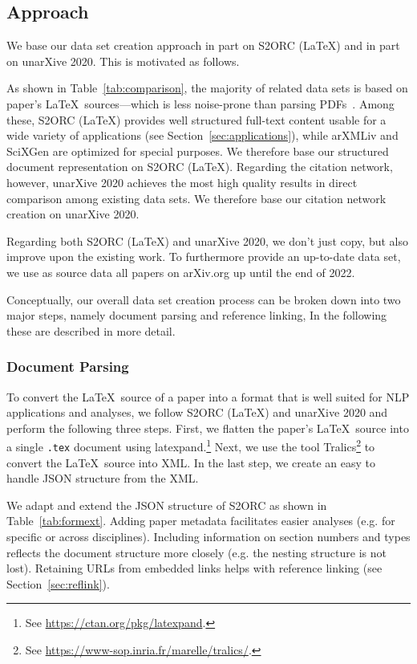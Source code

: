 \subsection{Approach}

We base our data set creation approach in part on S2ORC (\LaTeX) and in part on unarXive 2020. This is motivated as follows.

As shown in Table~\ref{tab:comparison}, the majority of related data sets is based on paper's \LaTeX\ sources---which is less noise-prone than parsing PDFs~\cite{Bast2017}. Among these, S2ORC (\LaTeX) provides well structured full-text content usable for a wide variety of applications (see Section~\ref{sec:applications}), while arXMLiv and SciXGen are optimized for special purposes. We therefore base our structured document representation on S2ORC (\LaTeX). Regarding the citation network, however, unarXive 2020 achieves the most high quality results in direct comparison among existing data sets. We therefore base our citation network creation on unarXive 2020.

Regarding both S2ORC (\LaTeX) and unarXive 2020, we don't just copy, but also improve upon the existing work. To furthermore provide an up-to-date data set, we use as source data all papers on arXiv.org up until the end of 2022.

Conceptually, our overall data set creation process can be broken down into two major steps, namely document parsing and reference linking, In the following these are described in more detail.

\subsubsection{Document Parsing}
To convert the \LaTeX\ source of a paper into a format that is well suited for NLP applications and analyses, we follow S2ORC (\LaTeX) and unarXive 2020 and perform the following three steps. First, we flatten the paper's \LaTeX\ source into a single \texttt{.tex} document using latexpand.\footnote{See \url{https://ctan.org/pkg/latexpand}.} Next, we use the tool Tralics\footnote{See \url{https://www-sop.inria.fr/marelle/tralics/}.} to convert the \LaTeX\ source into XML. In the last step, we create an easy to handle JSON structure from the XML.

We adapt and extend the JSON structure of S2ORC as shown in Table~\ref{tab:formext}. Adding paper metadata facilitates easier analyses (e.g. for specific or across disciplines). Including information on section numbers and types reflects the document structure more closely (e.g. the nesting structure is not lost). Retaining URLs from embedded links helps with reference linking (see Section~\ref{sec:reflink}).

